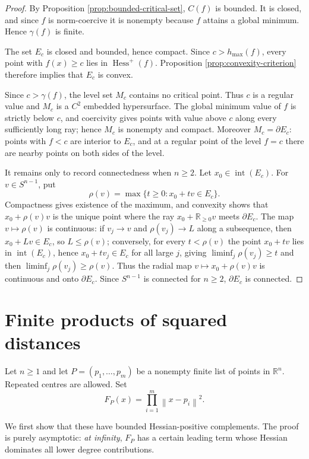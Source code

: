 \documentclass[11pt]{amsart}
\theoremstyle{remark}
\newcommand{\Hessp}{\operatorname{Hess}^{+}}
\newcommand{\R}{\mathbb{R}}
\newcommand{\norm}[1]{\left\lVert #1\right\rVert}
\begin{document}
\begin{proof}
By Proposition \ref{prop:bounded-critical-set}, $C(f)$ is bounded. It is closed,
and since $f$ is norm-coercive it is nonempty because $f$ attains a global
minimum. Hence $\gamma(f)$ is finite.

The set $E_c$ is closed and bounded, hence compact. Since $c>h_{\max}(f)$, every
point with $f(x)\ge c$ lies in $\Hessp(f)$. Proposition
\ref{prop:convexity-criterion} therefore implies that $E_c$ is convex.

Since $c>\gamma(f)$, the level set $M_c$ contains no critical point. Thus $c$ is a
regular value and $M_c$ is a $C^2$ embedded hypersurface. The global minimum
value of $f$ is strictly below $c$, and coercivity gives points with value above
$c$ along every sufficiently long ray; hence $M_c$ is nonempty and compact.
Moreover $M_c=\partial E_c$: points with $f<c$ are interior to $E_c$, and at a
regular point of the level $f=c$ there are nearby points on both sides of the
level.

It remains only to record connectedness when $n\ge2$. Let
$x_0\in\operatorname{int}(E_c)$. For $v\in S^{n-1}$, put
\[
 \rho(v)=\max\{t\ge0:x_0+tv\in E_c\}.
\]
Compactness gives existence of the maximum, and convexity shows that
$x_0+\rho(v)v$ is the unique point where the ray $x_0+\R_{\ge0}v$ meets
$\partial E_c$. The map $v\mapsto \rho(v)$ is continuous: if $v_j\to v$ and
$\rho(v_j)\to L$ along a subsequence, then $x_0+Lv\in E_c$, so
$L\le\rho(v)$; conversely, for every $t<\rho(v)$ the point $x_0+tv$ lies in
$\operatorname{int}(E_c)$, hence $x_0+tv_j\in E_c$ for all large $j$, giving
$\liminf_j\rho(v_j)\ge t$ and then $\liminf_j\rho(v_j)\ge\rho(v)$. Thus the
radial map $v\mapsto x_0+\rho(v)v$ is continuous and onto $\partial E_c$.
Since $S^{n-1}$ is connected for $n\ge2$, $\partial E_c$ is connected.
\end{proof}

\section{Finite products of squared distances}

Let $n\ge1$ and let $P=(p_1,\dots,p_m)$ be a nonempty finite list of points in
$\R^n$. Repeated centres are allowed. Set
\[
 F_P(x)=\prod_{i=1}^m \norm{x-p_i}^2.
\]

We first show that these have bounded Hessian-positive complements. The proof is purely asymptotic: \textit{at infinity}, $F_P$ has a certain leading term whose Hessian dominates all lower degree contributions. 
\end{document}

